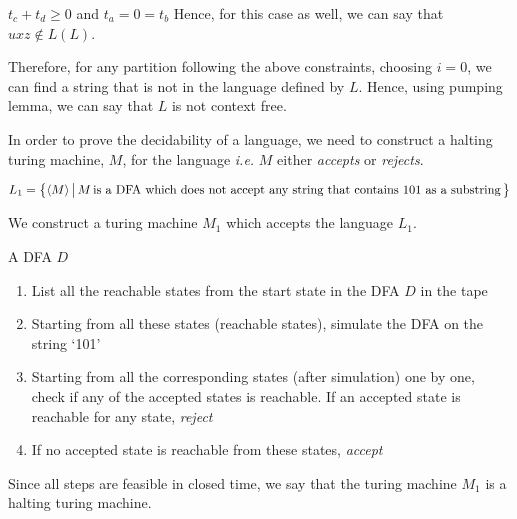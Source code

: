 \documentclass{article}
\begin{document}
\begin{question}
\begin{qpart}{3}
\begin{qcase}{3}{$t_c + t_d \ge 0$ and $t_a = 0 = t_b$}
			Hence, for this case as well, we can say that $uxz \notin L(L)$.
			
		\end{qcase}

		Therefore, for any partition following the above constraints, choosing $i = 0$, we can find a string that is not in the language defined by $L$. Hence, using pumping lemma, we can say that $L$ is not context free.
		
	\end{qpart}

\end{question}

\begin{question}

	In order to prove the decidability of a language, we need to construct a halting turing machine, $M$, for the language \textit{i.e.} $M$ either \textit{accepts} or \textit{rejects}.

	\begin{qpart}{1}

		\begin{align*}
			L_1 = \big\{ \langle M \rangle \,\big|\, M \,\text{is a DFA which does not accept any string that contains 101 as a substring}\, \big\}
		\end{align*}

		We construct a turing machine $M_1$ which accepts the language $L_1$. \br%

		 \br%
		\begin{margin}
			 A DFA $D$

			\begin{enumerate}
				\item List all the reachable states from the start state in the DFA $D$ in the tape
				\item Starting from all these states (reachable states), simulate the DFA on the string `101'
				\item Starting from all the corresponding states (after simulation) one by one, check if any of the accepted states is reachable. If an accepted state is reachable for any state, \textit{reject}
				\item If no accepted state is reachable from these states, \textit{accept}
			\end{enumerate}
		\end{margin}

		Since all steps are feasible in closed time, we say that the turing machine $M_1$ is a halting turing machine. \br%


\end{qpart}
\end{question}
\end{document}
